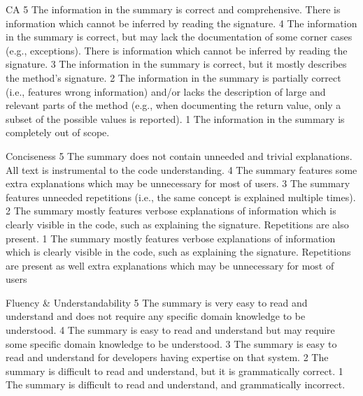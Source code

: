 CA	
	5	The information in the summary is correct and comprehensive. There is information which cannot be inferred by reading the signature.
	4	The information in the summary is correct, but may lack the documentation of some corner cases  (e.g., exceptions). There is information which cannot be inferred by reading the signature.
	3	The information in the summary is correct, but it mostly describes the method's signature.
	2	The information in the summary is partially correct (i.e., features wrong information) and/or lacks the description of large and relevant parts of the method (e.g., when documenting the return value, only a subset of the possible values is reported).
	1	The information in the summary is completely out of scope.
	
Conciseness	
	5	The summary does not contain unneeded and trivial explanations. All text is instrumental to the code understanding.
	4	The summary features some extra explanations which may be unnecessary for most of users.
	3	The summary features unneeded repetitions (i.e., the same concept is explained multiple times).
	2	The summary mostly features verbose explanations of information which is clearly visible in the code, such as explaining the signature. Repetitions are also present.
	1	The summary mostly features verbose explanations of information which is clearly visible in the code, such as explaining the signature. Repetitions are present as well extra explanations which may be unnecessary for most of users
	
Fluency & Understandability	
	5	The summary is very easy to read and understand and does not require any specific domain knowledge to be understood.
	4	The summary is easy to read and understand but may require some specific domain knowledge to be understood.
	3	The summary is easy to read and understand for developers having expertise on that system.
	2	The summary is difficult to read and understand, but it is grammatically correct.
	1	The summary is difficult to read and understand, and grammatically incorrect.